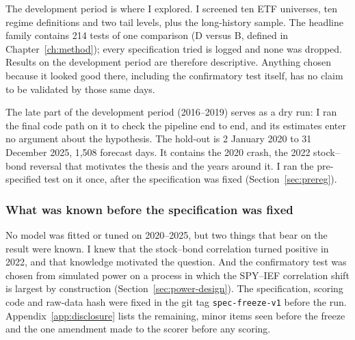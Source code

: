 The development period is where I explored. I screened ten ETF universes, ten regime definitions and two tail levels, plus the long-history sample. The headline family contains 214 tests of one comparison (D versus B, defined in Chapter~\ref{ch:method}); every specification tried is logged and none was dropped. Results on the development period are therefore descriptive. Anything chosen because it looked good there, including the confirmatory test itself, has no claim to be validated by those same days.

The late part of the development period (2016--2019) serves as a dry run: I ran the final code path on it to check the pipeline end to end, and its estimates enter no argument about the hypothesis. The hold-out is 2 January 2020 to 31 December 2025, 1,508 forecast days. It contains the 2020 crash, the 2022 stock--bond reversal that motivates the thesis and the years around it. I ran the pre-specified test on it once, after the specification was fixed (Section~\ref{sec:prereg}).

\subsubsection{What was known before the specification was fixed}\label{sec:disclosure}

No model was fitted or tuned on 2020--2025, but two things that bear on the result were known. I knew that the stock--bond correlation turned positive in 2022, and that knowledge motivated the question. And the confirmatory test was chosen from simulated power on a process in which the SPY--IEF correlation shift is largest by construction (Section~\ref{sec:power-design}). The specification, scoring code and raw-data hash were fixed in the git tag \texttt{spec-freeze-v1} before the run. Appendix~\ref{app:disclosure} lists the remaining, minor items seen before the freeze and the one amendment made to the scorer before any scoring.
